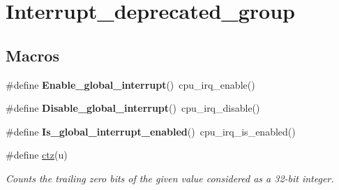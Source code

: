 \hypertarget{group__interrupt__deprecated__group}{}\section{Interrupt\+\_\+deprecated\+\_\+group}
\label{group__interrupt__deprecated__group}
\subsection*{Macros}
\begin{DoxyCompactItemize}
\item 
\mbox{\label{group__interrupt__deprecated__group_gaebdc47e7800e11d79b9e5e2da1fecaa6}} 
\#define {\bfseries Enable\+\_\+global\+\_\+interrupt}()~cpu\+\_\+irq\+\_\+enable()
\item 
\mbox{\label{group__interrupt__deprecated__group_ga4834270e1b8984fe025bce15e7ae1564}} 
\#define {\bfseries Disable\+\_\+global\+\_\+interrupt}()~cpu\+\_\+irq\+\_\+disable()
\item 
\mbox{\label{group__interrupt__deprecated__group_gab7b13c60d26b190e73e540586f1868f8}} 
\#define {\bfseries Is\+\_\+global\+\_\+interrupt\+\_\+enabled}()~cpu\+\_\+irq\+\_\+is\+\_\+enabled()
\item 
\#define \mbox{\hyperlink{group__interrupt__deprecated__group_gab069bfec305db5213465d3b689836404}{ctz}}(u)
\begin{DoxyCompactList}\small\item\em Counts the trailing zero bits of the given value considered as a 32-\/bit integer. \end{DoxyCompactList}\end{DoxyCompactItemize}
